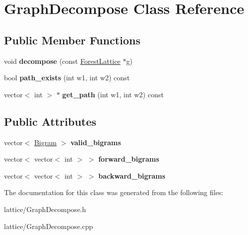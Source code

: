\hypertarget{classGraphDecompose}{
\section{GraphDecompose Class Reference}
\label{classGraphDecompose}
}
\subsection*{Public Member Functions}
\begin{DoxyCompactItemize}
\item 
\hypertarget{classGraphDecompose_a671b195e2a0eff48eeefcee64d40fcb1}{
void {\bfseries decompose} (const \hyperlink{classForestLattice}{ForestLattice} $\ast$g)}
\label{classGraphDecompose_a671b195e2a0eff48eeefcee64d40fcb1}

\item 
\hypertarget{classGraphDecompose_a8e85b51d78e6bd961bbff6d121399ba7}{
bool {\bfseries path\_\-exists} (int w1, int w2) const }
\label{classGraphDecompose_a8e85b51d78e6bd961bbff6d121399ba7}

\item 
\hypertarget{classGraphDecompose_a48e47d62512330c280ed8a89bafe3e10}{
vector$<$ int $>$ $\ast$ {\bfseries get\_\-path} (int w1, int w2) const }
\label{classGraphDecompose_a48e47d62512330c280ed8a89bafe3e10}

\end{DoxyCompactItemize}
\subsection*{Public Attributes}
\begin{DoxyCompactItemize}
\item 
\hypertarget{classGraphDecompose_afbeb52935da971f4bc27f0e80ed48d33}{
vector$<$ \hyperlink{structBigram}{Bigram} $>$ {\bfseries valid\_\-bigrams}}
\label{classGraphDecompose_afbeb52935da971f4bc27f0e80ed48d33}

\item 
\hypertarget{classGraphDecompose_aca254d25cf0f2d2ad0d58a5775a297a8}{
vector$<$ vector$<$ int $>$ $>$ {\bfseries forward\_\-bigrams}}
\label{classGraphDecompose_aca254d25cf0f2d2ad0d58a5775a297a8}

\item 
\hypertarget{classGraphDecompose_a2b5c495d7725ccd63c0c3d2590ebd1e1}{
vector$<$ vector$<$ int $>$ $>$ {\bfseries backward\_\-bigrams}}
\label{classGraphDecompose_a2b5c495d7725ccd63c0c3d2590ebd1e1}

\end{DoxyCompactItemize}


The documentation for this class was generated from the following files:\begin{DoxyCompactItemize}
\item 
lattice/GraphDecompose.h\item 
lattice/GraphDecompose.cpp\end{DoxyCompactItemize}

